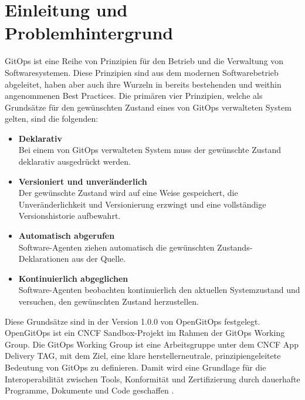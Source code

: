 \chapter{Einleitung und Problemhintergrund}



GitOps ist eine Reihe von Prinzipien für den Betrieb und die Verwaltung von Softwaresystemen. Diese Prinzipien sind aus dem modernen Softwarebetrieb abgeleitet, haben aber auch ihre Wurzeln in bereits bestehenden und weithin angenommenen Best Practices. Die primären vier Prinzipien, welche als Grundsätze für den gewünschten Zustand eines
von GitOps verwalteten System gelten, sind die folgenden:

\begin{itemize}
	\item \textbf{Deklarativ} \\
		Bei einem von GitOps verwalteten System muss der gewünschte Zustand deklarativ ausgedrückt werden.
	\item \textbf{Versioniert und unveränderlich} \\
		Der gewünschte Zustand wird auf eine Weise gespeichert, die Unveränderlichkeit und Versionierung erzwingt und eine vollständige Versionshistorie aufbewahrt.
	\item \textbf{Automatisch abgerufen} \\
		Software-Agenten ziehen automatisch die gewünschten Zustands-Deklarationen aus der Quelle.
	\item \textbf{Kontinuierlich abgeglichen} \\
		Software-Agenten beobachten kontinuierlich den aktuellen Systemzustand und versuchen, den gewünschten Zustand herzustellen.
\end{itemize}

\autocite{gitopsPrinciplesv100}
\bigskip

Diese Grundsätze sind in der Version 1.0.0 von OpenGitOps festgelegt.
OpenGitOps ist ein CNCF Sandbox-Projekt im Rahmen der GitOps Working Group.
Die GitOps Working Group ist eine Arbeitsgruppe unter
dem CNCF App Delivery TAG,
mit dem Ziel, eine klare herstellerneutrale,
prinzipiengeleitete Bedeutung von GitOps zu definieren.
Damit wird eine Grundlage für die Interoperabilität zwischen Tools, Konformität und Zertifizierung durch dauerhafte Programme, Dokumente und Code geschaffen
\autocite{opengitopsDocuments}.
\bigskip


